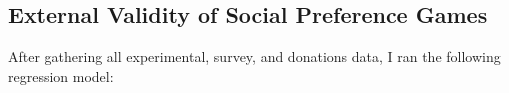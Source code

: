 \documentclass[12pt]{article}
\begin{document}
\subsection{External Validity of Social Preference Games}
After gathering all experimental, survey, and donations data, I ran the following regression model:


%
%
%
%
\end{document}
